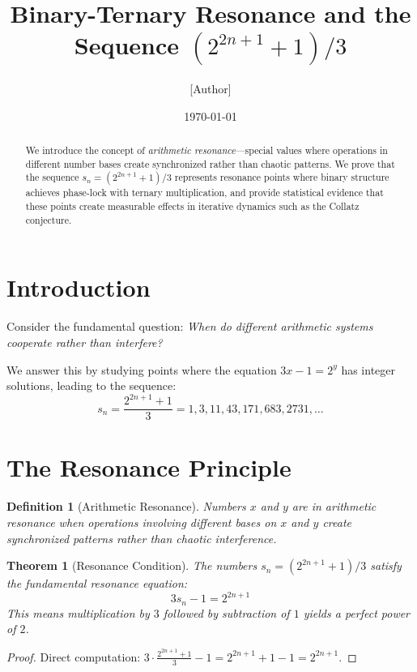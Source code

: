\documentclass[11pt]{article}
\title{Binary-Ternary Resonance and the Sequence $(2^{2n+1} + 1)/3$}
\author{[Author]}
\date{\today}
\newtheorem{theorem}{Theorem}
\newtheorem{definition}{Definition}
\theoremstyle{remark}
\begin{document}
\maketitle

\begin{abstract}
We introduce the concept of \emph{arithmetic resonance}—special values where operations in different number bases create synchronized rather than chaotic patterns. We prove that the sequence $s_n = (2^{2n+1} + 1)/3$ represents resonance points where binary structure achieves phase-lock with ternary multiplication, and provide statistical evidence that these points create measurable effects in iterative dynamics such as the Collatz conjecture.
\end{abstract}

\section{Introduction}

Consider the fundamental question: \emph{When do different arithmetic systems cooperate rather than interfere?}

We answer this by studying points where the equation $3x - 1 = 2^y$ has integer solutions, leading to the sequence:
\[s_n = \frac{2^{2n+1} + 1}{3} = 1, 3, 11, 43, 171, 683, 2731, \ldots\]

\section{The Resonance Principle}

\begin{definition}[Arithmetic Resonance]
Numbers $x$ and $y$ are in \emph{arithmetic resonance} when operations involving different bases on $x$ and $y$ create synchronized patterns rather than chaotic interference.
\end{definition}

\begin{theorem}[Resonance Condition]
The numbers $s_n = (2^{2n+1} + 1)/3$ satisfy the fundamental resonance equation:
\[3s_n - 1 = 2^{2n+1}\]
This means multiplication by $3$ followed by subtraction of $1$ yields a perfect power of $2$.
\end{theorem}

\begin{proof}
Direct computation: $3 \cdot \frac{2^{2n+1} + 1}{3} - 1 = 2^{2n+1} + 1 - 1 = 2^{2n+1}$.
\end{proof}
\end{document}
